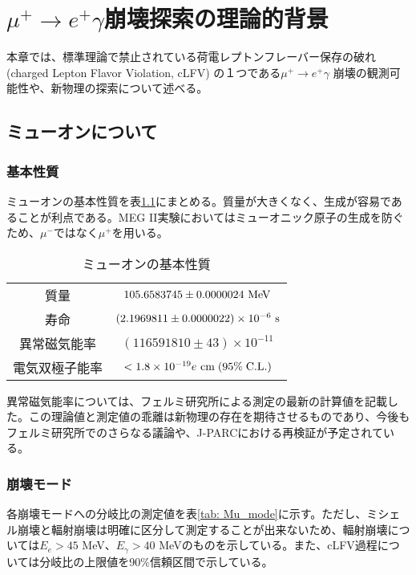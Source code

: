 \documentclass[Yonemoto_master.tex]{subfiles}
\begin{document}
\chapter{$\mu^+ \to e^+ \gamma$崩壊探索の理論的背景}
本章では、標準理論で禁止されている荷電レプトンフレーバー保存の破れ (charged Lepton Flavor Violation, cLFV) の１つである$\mu^+ \to e^+ \gamma$ 崩壊の観測可能性や、新物理の探索について述べる。

\section{ミューオンについて}
\subsection{基本性質}
ミューオンの基本性質を表\ref{tab: Mu_prop}にまとめる。質量が大きくなく、生成が容易であることが利点である。MEG II実験においてはミューオニック原子の生成を防ぐため、$\mu^-$ではなく$\mu^+$を用いる。

\begin{table}[h]
 \centering
 \caption{ミューオンの基本性質 \cite{muon}}
 \label{tab: Mu_prop}
  \begin{tabular}{cc}
   \hline
   質量 & $105.6583745 \pm 0.0000024 \ {\rm MeV}$ \\
   寿命 & $(2.1969811 \pm 0.0000022) \times 10^{-6} \ {\rm s}$ \\ 
   異常磁気能率 & $(116591810 \pm 43) \times 10^{-11} $ \cite{fermi_g2}\\
   電気双極子能率 & $< 1.8 \times 10^{-19} e \ {\rm cm} \; (95\% \; {\rm C.L.})$ \\
   \hline
  \end{tabular}
\end{table}

異常磁気能率については、フェルミ研究所による測定の最新の計算値を記載した。この理論値と測定値の乖離は新物理の存在を期待させるものであり、今後もフェルミ研究所でのさらなる議論や、J-PARCにおける再検証が予定されている\cite{jparc_g2}。

\subsection{崩壊モード}
各崩壊モードへの分岐比の測定値を表\ref{tab: Mu_mode}に示す。ただし、ミシェル崩壊と輻射崩壊は明確に区分して測定することが出来ないため、輻射崩壊については$E_e > 45$ MeV、$E_\gamma > 40$ MeVのものを示している。また、cLFV過程については分岐比の上限値を90\%信頼区間で示している。
\end{document}
